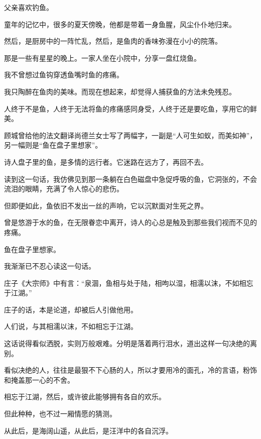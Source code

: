 		\vspace{1em}
		父亲喜欢钓鱼。\par
		童年的记忆中，很多的夏天傍晚，他都是带着一身鱼腥，风尘仆仆地归来。\par
		然后，是厨房中的一阵忙乱，然后，是鱼肉的香味弥漫在小小的院落。\par
		那是一些有星星的晚上。一家人坐在小院中，分享一盘红烧鱼。

		\vspace{1em}
		我不曾想过鱼钩穿透鱼嘴时鱼的疼痛。\par
		我只陶醉在鱼肉的美味。而现在想起来，却觉得人捕获鱼的方法未免残忍。\par
		人终于不是鱼，人终于无法将鱼的疼痛感同身受，人终于还是要吃鱼，享用它的鲜美。

		\vspace{1em}
		顾城曾给他的法文翻译尚德兰女士写了两幅字，一副是“人可生如蚁，而美如神”，另一幅则是“鱼在盘子里想家”。\par
		诗人盘子里的鱼，是多情的远行者。它迷路在远方了，再回不去。\par
		读到这一句话，我仿佛见到那一条躺在白色磁盘中急促呼吸的鱼，它洞张的，不会流泪的眼睛，充满了令人惊心的悲伤。\par
		但即便如此，鱼依旧不发出一丝的声响，它以沉默面对生死之界。

		\vspace{1em}
		曾是悠游于水的鱼，在无限眷恋中离开，诗人的心总是触及到那些我们视而不见的疼痛。\par
		鱼在盘子里想家。\par
		我渐渐已不忍心读这一句话。

		\vspace{1em}
		庄子《大宗师》中有言：“泉涸，鱼相与处于陆，相呴以湿，相濡以沫，不如相忘于江湖。”\par
		庄子的话，本是论道，却被后人引做他用。

		\vspace{1em}
		人们说，与其相濡以沫，不如相忘于江湖。

		\vspace{1em}
		这话说得看似洒脱，实则万般艰难。分明是落着两行泪水，道出这样一句决绝的离别。\par
		看似决绝的人，往往是最狠不下心肠的人，所以才要用冷的面孔，冷的言语，粉饰和掩盖那一心的不舍。\par
		相忘于江湖，然后，或许彼此能够拥有各自的欢乐。\par
		但此种种，也不过一厢情愿的猜测。\par
		从此后，是海阔山遥，从此后，是汪洋中的各自沉浮。

